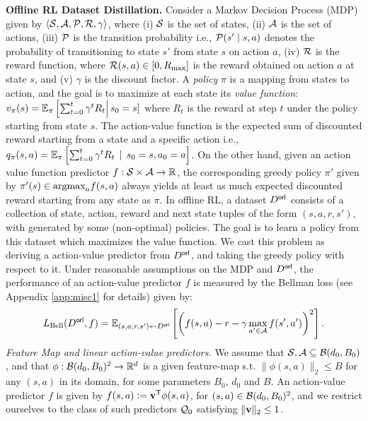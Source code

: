 {\bf Offline RL Dataset Distillation.}
Consider a Markov Decision Process (MDP) given by $\langle \mathcal{S}, \mathcal{A}, \mathcal{P}, \mathcal{R}, \gamma\rangle$, where (i) $\mathcal{S}$ is the set of states, (ii) $\mathcal{A}$ is the set of actions, (iii) $\mathcal{P}$ is the transition probability i.e., $\mathcal{P}(s'\mid s,a)$ denotes the probability of transitioning to state $s'$ from state $s$ on action $a$, (iv) $\mathcal{R}$ is the reward function, where $\mathcal{R}(s,a) \in [0, R_{\textnormal{max}}]$ is the reward obtained on action $a$ at state $s$, and (v) $\gamma$ is the discount factor. A \emph{policy} $\pi$ is a mapping from states to action, and the goal is to maximize at each state its \emph{value function}: $v_\pi(s) = \mathbb{E}_{\pi}\left[\sum_{t=0}^t \gamma^t R_t\right|s_0 = s]$ where $R_t$ is the reward at step $t$ under the policy starting from state $s$. The action-value function is the expected sum of discounted reward starting from a state and a specific action i.e., $q_{\pi}(s,a) = \mathbb{E}_{\pi}\left[\sum_{t=0}^t \gamma^t R_t\,\mid\, s_0 = s, a_0 = a\right]$. On the other hand, given an action value function predictor $f : \mathcal{S} \times \mathcal{A} \to \mathbb{R}$, the corresponding greedy policy $\pi'$ given by $\pi'(s)\in \textnormal{argmax}_a f(s, a)$ always yields at least as much expected discounted reward starting from any state as $\pi$. 
In offline RL, a dataset $D^{\sf orl}$ consists of a collection  of state, action, reward and next state tuples of the form $(s,a,r,s')$, with generated by some (non-optimal) policies. The goal is to learn a policy from this dataset which maximizes the value function. We cast this problem as deriving a action-value predictor from $D^{\sf orl}$, and taking the greedy policy with respect to it. Under reasonable assumptions on the  MDP and $D^{\sf orl}$, the performance of an action-value predictor $f$ is measured by the Bellman loss (see Appendix \ref{app:misc1} for details) given by:
\begin{equation}
    L_{\textnormal{Bell}}(D^{\sf orl}, f) = \mathbb{E}_{(s, a, r, s') \leftarrow D^{\sf orl}}\left[\left(f(s, a) - r - \gamma \max_{a' \in \mathcal{A}} f(s',a')\right)^2\right]. 
\end{equation}
{\it Feature Map and linear action-value predictors.} We assume that $\mathcal{S},  \mathcal{A} \subseteq \mathcal{B}(d_0, B_0)$, and that $\phi : \mathcal{B}(d_0, B_0)^2 \to \mathbb{R}^d$ is a given feature-map s.t. $\|\phi(s,a)\|_2 \leq B$ for any $(s,a)$ in its domain, for some parameters $B_0$, $d_0$ and $B$. An action-value predictor $f$ is given by $f(s, a) := {\mathbf{v}}^{\sf T}\phi(s,a)$, for $(s,a) \in \mathcal{B}(d_0, B_0)^2$, and we restrict ourselves to the class of such predictors $\mathcal{Q}_0$ satisfying $\|{\mathbf{v}}\|_2 \leq 1$. \\
